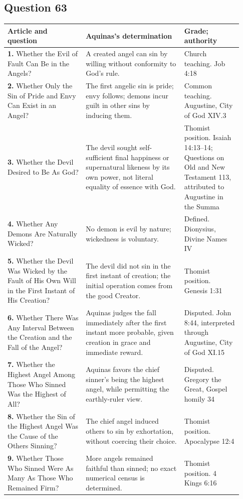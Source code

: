 \subsection{Question 63}
\begin{longtable}{@{}>{\raggedright\arraybackslash}p{0.31\linewidth}>{\raggedright\arraybackslash}p{0.39\linewidth}>{\raggedright\arraybackslash}p{0.23\linewidth}@{}}
\toprule
Article and question & Aquinas's determination & Grade; authority\\
\midrule\endhead
\textbf{1.} Whether the Evil of Fault Can Be in the Angels? & A created angel can sin by willing without conformity to God's rule. & Church teaching. Job 4:18\\
\textbf{2.} Whether Only the Sin of Pride and Envy Can Exist in an Angel? & The first angelic sin is pride; envy follows; demons incur guilt in other sins by inducing them. & Common teaching. Augustine, City of God XIV.3\\
\textbf{3.} Whether the Devil Desired to Be As God? & The devil sought self-sufficient final happiness or supernatural likeness by its own power, not literal equality of essence with God. & Thomist position. Isaiah 14:13--14; Questions on Old and New Testament 113, attributed to Augustine in the Summa\\
\textbf{4.} Whether Any Demons Are Naturally Wicked? & No demon is evil by nature; wickedness is voluntary. & Defined. Dionysius, Divine Names IV\\
\textbf{5.} Whether the Devil Was Wicked by the Fault of His Own Will in the First Instant of His Creation? & The devil did not sin in the first instant of creation; the initial operation comes from the good Creator. & Thomist position. Genesis 1:31\\
\textbf{6.} Whether There Was Any Interval Between the Creation and the Fall of the Angel? & Aquinas judges the fall immediately after the first instant more probable, given creation in grace and immediate reward. & Disputed. John 8:44, interpreted through Augustine, City of God XI.15\\
\textbf{7.} Whether the Highest Angel Among Those Who Sinned Was the Highest of All? & Aquinas favors the chief sinner's being the highest angel, while permitting the earthly-ruler view. & Disputed. Gregory the Great, Gospel homily 34\\
\textbf{8.} Whether the Sin of the Highest Angel Was the Cause of the Others Sinning? & The chief angel induced others to sin by exhortation, without coercing their choice. & Thomist position. Apocalypse 12:4\\
\textbf{9.} Whether Those Who Sinned Were As Many As Those Who Remained Firm? & More angels remained faithful than sinned; no exact numerical census is determined. & Thomist position. 4 Kings 6:16\\
\bottomrule
\end{longtable}
